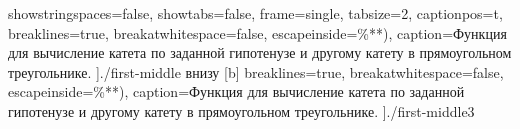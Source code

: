 \begin{itemize}
		showstringspaces=false,      %
		showtabs=false,             %
		frame=single,              %
		tabsize=2,                 %
		captionpos=t,              %
		breaklines=true,           %
		breakatwhitespace=false, %
		escapeinside={\%*}{*)},  %
		caption=Функция для вычисление катета по заданной гипотенузе и другому катету в прямоугольном треугольнике.
		]{./first-middle}
		 внизу [b] 
		breaklines=true,           %
		breakatwhitespace=false, %
		escapeinside={\%*}{*)},  %
		caption=Функция для вычисление катета по заданной гипотенузе и другому катету в прямоугольном треугольнике.
		]{./first-middle3}
\end{itemize}